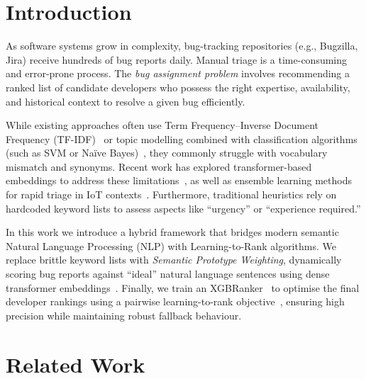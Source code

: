 \documentclass[sigconf,review,anonymous]{acmart}
\begin{document}
\section{Introduction}

As software systems grow in complexity, bug-tracking repositories (e.g.,
Bugzilla, Jira) receive hundreds of bug reports daily.
Manual triage is a time-consuming and error-prone process.
The \emph{bug assignment problem} involves recommending a ranked list of
candidate developers who possess the right expertise, availability, and
historical context to resolve a given bug efficiently.

While existing approaches often use Term Frequency--Inverse Document
Frequency (TF-IDF)~\cite{salton1988tfidf} or topic modelling combined with classification
algorithms (such as SVM or Na\"{i}ve Bayes)~\cite{cubranic2004hipikat, anvik2006triage}, they commonly struggle with
vocabulary mismatch and synonyms.
Recent work has explored transformer-based embeddings to address these
limitations~\cite{zaidi2022transformers}, as well as ensemble learning
methods for rapid triage in IoT contexts~\cite{yin2018elm}.
Furthermore, traditional heuristics rely on hardcoded keyword lists to
assess aspects like ``urgency'' or ``experience required.''

In this work we introduce a hybrid framework that bridges modern semantic
Natural Language Processing (NLP) with Learning-to-Rank algorithms.
We replace brittle keyword lists with \emph{Semantic Prototype Weighting},
dynamically scoring bug reports against ``ideal'' natural language sentences
using dense transformer embeddings~\cite{reimers2019sentencetransformers}.
Finally, we train an XGBRanker~\cite{chen2016xgboost} to optimise the final
developer rankings using a pairwise learning-to-rank
objective~\cite{liu2009ltr}, ensuring high precision while maintaining
robust fallback behaviour.

\section{Related Work}
\end{document}
